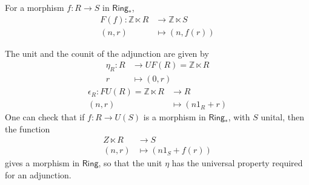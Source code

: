 For a morphism $f: R \to S$ in $\mathsf{Ring_*}$,
\begin{align*}
    F(f) : \mathbb{Z} \ltimes R &\to \mathbb{Z} \ltimes S \\
    (n,r) &\mapsto (n, f(r))
\end{align*}

The unit and the counit of the adjunction are given by
\begin{align*}
\eta_R: R &\to UF(R)=\mathbb{Z} \ltimes R \\
r &\mapsto (0,r)
\end{align*}
\begin{align*}
\epsilon_R: FU(R)=\mathbb{Z} \ltimes R &\to R  \\
(n,r) &\mapsto (n1_R + r)
\end{align*}
One can check that if $f: R \to
U(S)$ is a morphism in $\mathsf{Ring_*}$, with $S$ unital, then the function 
\begin{align*}
Z \ltimes R &\to S \\
(n,r) &\mapsto (n1_S + f(r))
\end{align*}
gives a morphism in $\mathsf{Ring}$, so that the unit $\eta$ has the universal property required for an adjunction.

